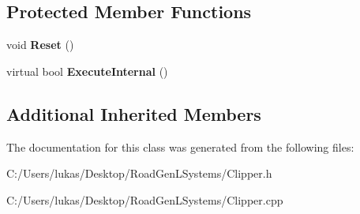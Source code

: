 \subsection*{Protected Member Functions}
\begin{DoxyCompactItemize}
\item 
\hypertarget{class_clipper_lib_1_1_clipper_a14c704b062e8a079e34a8ce40838861e}{}\label{class_clipper_lib_1_1_clipper_a14c704b062e8a079e34a8ce40838861e} 
void {\bfseries Reset} ()
\item 
\hypertarget{class_clipper_lib_1_1_clipper_a3e8757e5f8a6ffcb7fd0f9630fde02d3}{}\label{class_clipper_lib_1_1_clipper_a3e8757e5f8a6ffcb7fd0f9630fde02d3} 
virtual bool {\bfseries Execute\+Internal} ()
\end{DoxyCompactItemize}
\subsection*{Additional Inherited Members}


The documentation for this class was generated from the following files\+:\begin{DoxyCompactItemize}
\item 
C\+:/\+Users/lukas/\+Desktop/\+Road\+Gen\+L\+Systems/Clipper.\+h\item 
C\+:/\+Users/lukas/\+Desktop/\+Road\+Gen\+L\+Systems/Clipper.\+cpp\end{DoxyCompactItemize}

